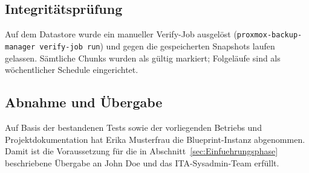 \subsection{Integritätsprüfung}
Auf dem Datastore wurde ein manueller Verify-Job ausgelöst
(\texttt{proxmox-backup-manager verify-job run}) und gegen die
gespeicherten Snapshots laufen gelassen. Sämtliche Chunks wurden
als gültig markiert; Folgeläufe sind als wöchentlicher
Schedule eingerichtet.

\subsection{Abnahme und Übergabe}
Auf Basis der bestandenen Tests sowie der vorliegenden Betriebs\-
und Projekt\-dokumentation hat Erika Musterfrau die Blueprint-Instanz
abgenommen. Damit ist die Voraussetzung für die in
Abschnitt~\ref{sec:Einfuehrungsphase} beschriebene Übergabe an
John Doe und das \ac{ITA}-Sysadmin-Team erfüllt.
